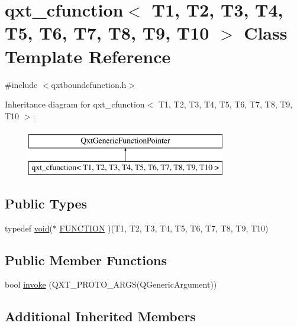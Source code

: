 \hypertarget{classqxt__cfunction}{\section{qxt\-\_\-cfunction$<$ T1, T2, T3, T4, T5, T6, T7, T8, T9, T10 $>$ Class Template Reference}
\label{classqxt__cfunction}
}


{\ttfamily \#include $<$qxtboundcfunction.\-h$>$}

Inheritance diagram for qxt\-\_\-cfunction$<$ T1, T2, T3, T4, T5, T6, T7, T8, T9, T10 $>$\-:\begin{figure}[H]
\begin{center}
\leavevmode
\includegraphics[height=2.000000cm]{classqxt__cfunction}
\end{center}
\end{figure}
\subsection*{Public Types}
\begin{DoxyCompactItemize}
\item 
typedef \hyperlink{group___u_a_v_objects_plugin_ga444cf2ff3f0ecbe028adce838d373f5c}{void}($\ast$ \hyperlink{classqxt__cfunction_a0bed98a1ad1da8e4bcb5d224c8b41fab}{F\-U\-N\-C\-T\-I\-O\-N} )(T1, T2, T3, T4, T5, T6, T7, T8, T9, T10)
\end{DoxyCompactItemize}
\subsection*{Public Member Functions}
\begin{DoxyCompactItemize}
\item 
bool \hyperlink{classqxt__cfunction_a1d38d0efadb12b7e1bc5b53b4734407b}{invoke} (Q\-X\-T\-\_\-\-P\-R\-O\-T\-O\-\_\-A\-R\-G\-S(Q\-Generic\-Argument))
\end{DoxyCompactItemize}
\subsection*{Additional Inherited Members}


